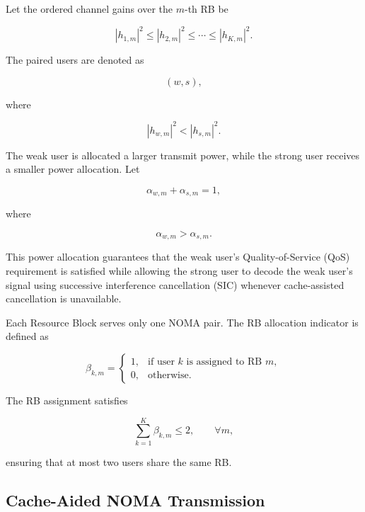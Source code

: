 \documentclass[conference]{IEEEtran}
\begin{document}
Let the ordered channel gains over the $m$-th RB be

\begin{equation}
|h_{1,m}|^2
\le
|h_{2,m}|^2
\le
\cdots
\le
|h_{K,m}|^2.
\end{equation}

The paired users are denoted as

\begin{equation}
(w,s),
\end{equation}

where

\begin{equation}
|h_{w,m}|^2<|h_{s,m}|^2.
\end{equation}

The weak user is allocated a larger transmit power, while the strong user receives a smaller power allocation. Let

\begin{equation}
\alpha_{w,m}+\alpha_{s,m}=1,
\end{equation}

where

\begin{equation}
\alpha_{w,m}>\alpha_{s,m}.
\end{equation}

This power allocation guarantees that the weak user's Quality-of-Service (QoS) requirement is satisfied while allowing the strong user to decode the weak user's signal using successive interference cancellation (SIC) whenever cache-assisted cancellation is unavailable.

Each Resource Block serves only one NOMA pair. The RB allocation indicator is defined as

\begin{equation}
\beta_{k,m}
=
\begin{cases}
1,&\text{if user }k\text{ is assigned to RB }m,\\
0,&\text{otherwise}.
\end{cases}
\end{equation}

The RB assignment satisfies

\begin{equation}
\sum_{k=1}^{K}\beta_{k,m}\le2,
\qquad
\forall m,
\end{equation}

ensuring that at most two users share the same RB.

\subsection{Cache-Aided NOMA Transmission}
\end{document}
